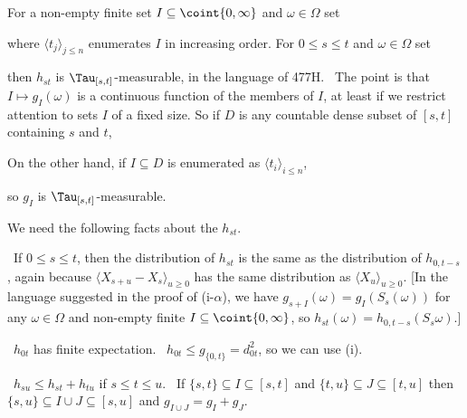{\medskip

For a non-empty finite set $I\subseteq\coint{0,\infty}$ and
$\omega\in\Omega$ set


\noindent where $\langle t_j\rangle_{j\le n}$ enumerates $I$ in increasing
order.   For $0\le s\le t$ and $\omega\in\Omega$ set


\noindent then $h_{st}$ is $\Tau_{[s,t]}$-measurable, in the language of
477H.   \Prf\ The point is that
$I\mapsto g_I(\omega)$ is a continuous function of the members of $I$,
at least if we restrict attention to sets $I$ of a fixed size.
So if $D$ is any countable dense subset of $[s,t]$ containing $s$ and $t$,


\noindent On the other hand, if $I\subseteq D$ is enumerated as
$\langle t_i\rangle_{i\le n}$,


\noindent so $g_I$ is $\Tau_{[s,t]}$-measurable.\ \Qed

\medskip

 We need the following facts about the $h_{st}$.

\medskip

\qquad\grheada\ If $0\le s\le t$, then the distribution of $h_{st}$ is the
same as the distribution of $h_{0,t-s}$, again because
$\langle X_{s+u}-X_s\rangle_{u\ge 0}$ has the same distribution as
$\langle X_u\rangle_{u\ge 0}$.   [In the language suggested in the proof of
(i-$\alpha$),
we have $g_{s+I}(\omega)=g_I(S_s(\omega))$ for any $\omega\in\Omega$
and non-empty finite $I\subseteq\coint{0,\infty}$, so
$h_{st}(\omega)=h_{0,t-s}(S_s\omega)$.]

\medskip

\qquad\grheadb\ $h_{0t}$ has finite expectation.   \Prf\
$h_{0t}\le g_{\{0,t\}}=d_{0t}^2$, so we can use (i).\ \Qed

\medskip

\qquad\grheadc\ $h_{su}\le h_{st}+h_{tu}$ if $s\le t\le u$.   \Prf\ If
$\{s,t\}\subseteq I\subseteq[s,t]$ and $\{t,u\}\subseteq J\subseteq[t,u]$
then $\{s,u\}\subseteq I\cup J\subseteq[s,u]$ and
$g_{I\cup J}=g_I+g_J$.\ \QeD\

}
